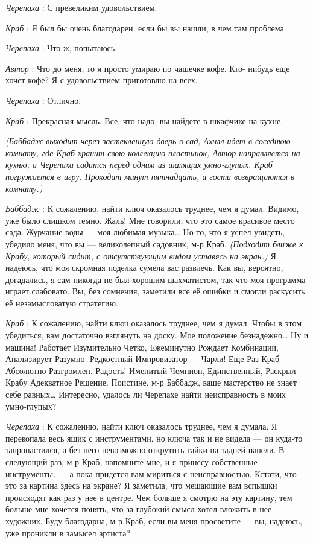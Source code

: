 \documentclass[../main.tex]{subfiles}
\begin{document}
\begin{dialogue}
\emph{Черепаха} : С превеликим удовольствием.

\emph{Краб} : Я был бы очень благодарен, если бы вы нашли, в чем там проблема.

\emph{Черепаха} : Что ж, попытаюсь.

\emph{Автор} : Что до меня, то я просто умираю по чашечке кофе. Кто- нибудь еще хочет кофе? Я с удовольствием приготовлю на всех.

\emph{Черепаха} : Отлично.

\emph{Краб} : Прекрасная мысль. Все, что надо, вы найдете в шкафчике на кухне.

\emph{(Баббадж выходит через застекленную дверь в сад, Ахилл идет в соседнюю комнату, где Краб хранит свою коллекцию пластинок, Автор направляется на кухню, а Черепаха садится перед одним из шалящих умно-глупых. Краб погружается в игру. Проходит минут пятнадцать, и гости возвращаются в комнату.)}

\emph{Баббадж} : К сожалению, найти ключ оказалось труднее, чем я думал. Видимо, уже было слишком темно. Жаль! Мне говорили, что это самое красивое место сада. Журчание воды --- моя любимая музыка\ldots{} Но то, что я успел увидеть, убедило меня, что вы --- великолепный садовник, м-р Краб. \emph{(Подходит ближе к Крабу, который сидит, с отсутствующим видом уставясь на экран.)} Я надеюсь, что моя скромная поделка сумела вас развлечь. Как вы, вероятно, догадались, я сам никогда не был хорошим шахматистом, так что моя программа играет слабовато. Вы, без сомнения, заметили все её ошибки и смогли раскусить её незамысловатую стратегию.

\emph{Краб} : К сожалению, найти ключ оказалось труднее, чем я думал. Чтобы в этом убедиться, вам достаточно взглянуть на доску. Мое положение безнадежно\ldots{} Ну и машина! Работает Изумительно Четко, Ежеминутно Рождает Комбинации, Анализирует Разумно. Редкостный Импровизатор --- Чарли! Еще Раз Краб Абсолютно Разгромлен. Радость! Именитый Чемпион, Единственный, Раскрыл Крабу Адекватное Решение. Поистине, м-р Баббадж, ваше мастерство не знает себе равных\ldots{} Интересно, удалось ли Черепахе найти неисправность в моих умно-глупых?

\emph{Черепаха} : К сожалению, найти ключ оказалось труднее, чем я думала. Я перекопала весь ящик с инструментами, но ключа так и не видела --- он куда-то запропастился, а без него невозможно открутить гайки на задней панели. В следующий раз, м-р Краб, напомните мне, и я принесу собственные инструменты. --- а пока придется вам мириться с неисправностью. Кстати, что это за картина здесь на экране? Я заметила, что мешающие вам вспышки происходят как раз у нее в центре. Чем больше я смотрю на эту картину, тем больше мне хочется понять, что за глубокий смысл хотел вложить в нее художник. Буду благодарна, м-р Краб, если вы меня просветите --- вы, надеюсь, уже проникли в замысел артиста?


\end{dialogue}
\end{document}

